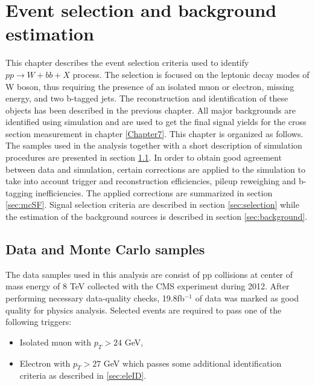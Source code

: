 
\chapter{Event selection and background estimation} %

\label{Chapter6} %


This chapter describes the event selection criteria used to identify $pp\rightarrow W+bb+X$ process. The selection is focused on the leptonic decay modes of W boson, thus requiring the presence of an isolated muon or electron, missing energy, and two b-tagged jets. The reconstruction and identification of these objects has been described in the previous chapter. All major backgrounds are identified using simulation and are used to get the final signal yields for the cross section measurement in chapter \ref{Chapter7}. 
This chapter is organized as follows. The samples used in the analysis together with a short description of simulation procedures are presented in section \ref{sec:samples}. In order to obtain good agreement between data and simulation, certain corrections are applied to the simulation to take into account trigger and reconstruction efficiencies, pileup reweighing and b-tagging inefficiencies. The applied corrections are summarized in section \ref{sec:mcSF}. Signal selection criteria are described in section \ref{sec:selection} while the estimation of the background sources is described in section \ref{sec:background}.     

\section{Data and Monte Carlo samples}
\label{sec:samples}
The data samples used in this analysis are consist of pp collisions at center of mass energy of 8 TeV collected with the CMS experiment during 2012. After performing necessary data-quality checks, 19.8fb$^{-1}$ of data was marked as good quality for physics analysis. Selected events are required to pass one of the following triggers:
\begin{itemize}
\item Isolated muon with $p_T>24$ GeV,
\item Electron with $p_T>27$ GeV which passes some additional identification criteria as described in \ref{sec:eleID}.
\end{itemize}

